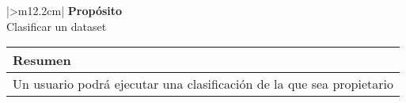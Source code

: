 \begin{table}[H]
    \begin{tabularx}{\linewidth}{|>{\centering\arraybackslash}m{12.2cm}|}
      \hline
      \rowcolor{\headerColor}\textbf{Propósito} \\
      \hline
      Clasificar un dataset \\
      \hline
    \end{tabularx}
\end{table}
\begin{table}[H]
    \begin{tabularx}{\linewidth}{|>{\centering\arraybackslash}m{12.2cm}|}
      \hline
      \rowcolor{\headerColor}\textbf{Resumen} \\
      \hline
      Un usuario podrá ejecutar una clasificación de la que sea propietario \\
      \hline
    \end{tabularx}
\end{table}
